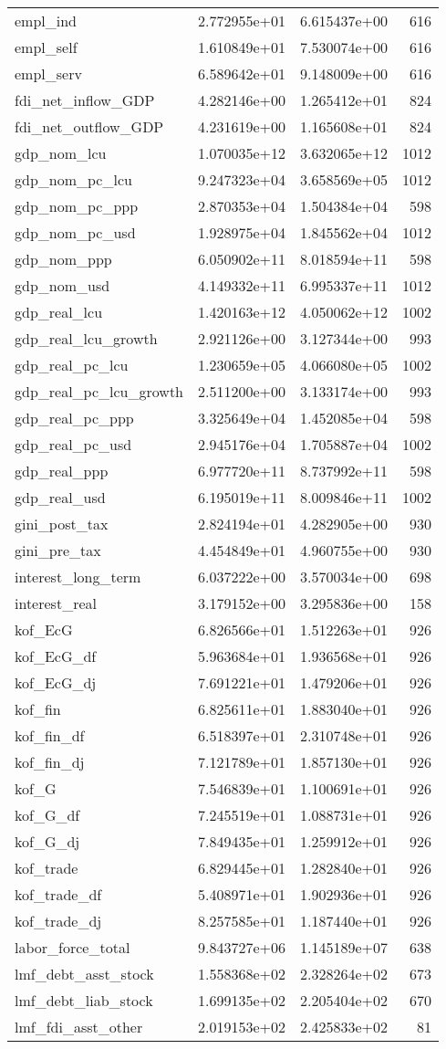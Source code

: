 \documentclass[]{article}
\begin{document}
\begin{longtable}[]{@{}lrrr@{}}
empl\_ind & 2.772955e+01 & 6.615437e+00 & 616\tabularnewline
empl\_self & 1.610849e+01 & 7.530074e+00 & 616\tabularnewline
empl\_serv & 6.589642e+01 & 9.148009e+00 & 616\tabularnewline
fdi\_net\_inflow\_GDP & 4.282146e+00 & 1.265412e+01 & 824\tabularnewline
fdi\_net\_outflow\_GDP & 4.231619e+00 & 1.165608e+01 &
824\tabularnewline
gdp\_nom\_lcu & 1.070035e+12 & 3.632065e+12 & 1012\tabularnewline
gdp\_nom\_pc\_lcu & 9.247323e+04 & 3.658569e+05 & 1012\tabularnewline
gdp\_nom\_pc\_ppp & 2.870353e+04 & 1.504384e+04 & 598\tabularnewline
gdp\_nom\_pc\_usd & 1.928975e+04 & 1.845562e+04 & 1012\tabularnewline
gdp\_nom\_ppp & 6.050902e+11 & 8.018594e+11 & 598\tabularnewline
gdp\_nom\_usd & 4.149332e+11 & 6.995337e+11 & 1012\tabularnewline
gdp\_real\_lcu & 1.420163e+12 & 4.050062e+12 & 1002\tabularnewline
gdp\_real\_lcu\_growth & 2.921126e+00 & 3.127344e+00 &
993\tabularnewline
gdp\_real\_pc\_lcu & 1.230659e+05 & 4.066080e+05 & 1002\tabularnewline
gdp\_real\_pc\_lcu\_growth & 2.511200e+00 & 3.133174e+00 &
993\tabularnewline
gdp\_real\_pc\_ppp & 3.325649e+04 & 1.452085e+04 & 598\tabularnewline
gdp\_real\_pc\_usd & 2.945176e+04 & 1.705887e+04 & 1002\tabularnewline
gdp\_real\_ppp & 6.977720e+11 & 8.737992e+11 & 598\tabularnewline
gdp\_real\_usd & 6.195019e+11 & 8.009846e+11 & 1002\tabularnewline
gini\_post\_tax & 2.824194e+01 & 4.282905e+00 & 930\tabularnewline
gini\_pre\_tax & 4.454849e+01 & 4.960755e+00 & 930\tabularnewline
interest\_long\_term & 6.037222e+00 & 3.570034e+00 & 698\tabularnewline
interest\_real & 3.179152e+00 & 3.295836e+00 & 158\tabularnewline
kof\_EcG & 6.826566e+01 & 1.512263e+01 & 926\tabularnewline
kof\_EcG\_df & 5.963684e+01 & 1.936568e+01 & 926\tabularnewline
kof\_EcG\_dj & 7.691221e+01 & 1.479206e+01 & 926\tabularnewline
kof\_fin & 6.825611e+01 & 1.883040e+01 & 926\tabularnewline
kof\_fin\_df & 6.518397e+01 & 2.310748e+01 & 926\tabularnewline
kof\_fin\_dj & 7.121789e+01 & 1.857130e+01 & 926\tabularnewline
kof\_G & 7.546839e+01 & 1.100691e+01 & 926\tabularnewline
kof\_G\_df & 7.245519e+01 & 1.088731e+01 & 926\tabularnewline
kof\_G\_dj & 7.849435e+01 & 1.259912e+01 & 926\tabularnewline
kof\_trade & 6.829445e+01 & 1.282840e+01 & 926\tabularnewline
kof\_trade\_df & 5.408971e+01 & 1.902936e+01 & 926\tabularnewline
kof\_trade\_dj & 8.257585e+01 & 1.187440e+01 & 926\tabularnewline
labor\_force\_total & 9.843727e+06 & 1.145189e+07 & 638\tabularnewline
lmf\_debt\_asst\_stock & 1.558368e+02 & 2.328264e+02 &
673\tabularnewline
lmf\_debt\_liab\_stock & 1.699135e+02 & 2.205404e+02 &
670\tabularnewline
lmf\_fdi\_asst\_other & 2.019153e+02 & 2.425833e+02 & 81\tabularnewline

\end{longtable}
\end{document}

